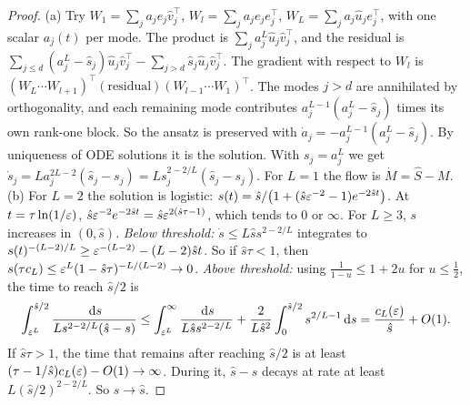\begin{proof}
(a) Try $W_1=\sum_ja_je_j\hat v_j^\top$, $W_l=\sum_ja_je_je_j^\top$, $W_L=\sum_ja_j\hat u_je_j^\top$, with one scalar $a_j(t)$ per mode. The
product is $\sum_ja_j^L\hat u_j\hat v_j^\top$, and the residual is $\sum_{j\le d}(a_j^L-\hat s_j)\hat u_j\hat v_j^\top-\sum_{j>d}\hat s_j\hat u_j\hat v_j^\top$. The gradient
with respect to $W_l$ is $(W_L\cdots W_{l+1})^\top(\text{residual})(W_{l-1}\cdots W_1)^\top$. The modes $j>d$ are annihilated by
orthogonality, and each remaining mode contributes $a_j^{L-1}(a_j^L-\hat s_j)$ times its own rank-one block. So the ansatz is
preserved with $\dot a_j=-a_j^{L-1}(a_j^L-\hat s_j)$. By uniqueness of ODE solutions it is the solution. With $s_j=a_j^L$ we get
$\dot s_j=La_j^{2L-2}(\hat s_j-s_j)=Ls_j^{2-2/L}(\hat s_j-s_j)$. For $L=1$ the flow is $\dot M=\hat S-M$.
(b) For $L=2$ the solution is logistic: $s(t)=\hat s/\big(1+(\hat s\varepsilon^{-2}-1)e^{-2\hat st}\big)$. At $t=\tau\ln(1/\varepsilon)$,
$\hat s\varepsilon^{-2}e^{-2\hat st}=\hat s\varepsilon^{2(\hat s\tau-1)}$, which tends to $0$ or $\infty$. For $L\ge3$, $s$ increases in $(0,\hat s)$.
\emph{Below threshold:} $\dot s\le L\hat ss^{2-2/L}$ integrates to $s(t)^{-(L-2)/L}\ge\varepsilon^{-(L-2)}-(L-2)\hat st$. So if $\hat s\tau<1$, then
$s(\tau c_L)\le\varepsilon^L(1-\hat s\tau)^{-L/(L-2)}\to0$.
\emph{Above threshold:} using $\frac1{1-u}\le1+2u$ for $u\le\frac12$, the time to reach $\hat s/2$ is
\[
\int_{\varepsilon^L}^{\hat s/2}\frac{\,\mathrm{d} s}{Ls^{2-2/L}(\hat s-s)}\le\int_{\varepsilon^L}^\infty\frac{\,\mathrm{d} s}{L\hat ss^{2-2/L}}+\frac2{L\hat s^2}\int_0^{\hat s/2}s^{2/L-1}\,\mathrm{d} s=\frac{c_L(\varepsilon)}{\hat s}+O(1).
\]
If $\hat s\tau>1$, the time that remains after reaching $\hat s/2$ is at least $(\tau-1/\hat s)c_L(\varepsilon)-O(1)\to\infty$. During it,
$\hat s-s$ decays at rate at least $L(\hat s/2)^{2-2/L}$. So $s\to\hat s$.
\end{proof}

